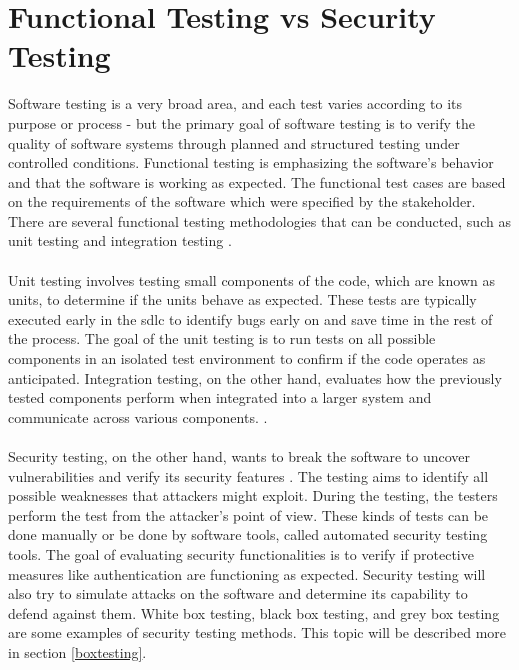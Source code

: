 \section{Functional Testing vs Security Testing}
\label{Functional Testing vs Security Testing}
Software testing is a very broad area, and each test varies according to its purpose or process - but the primary goal of software testing is to verify the quality of software systems through planned and structured testing under controlled conditions. Functional testing is emphasizing the software's behavior and that the software is working as expected. The functional test cases are based on the requirements of the software which were specified by the stakeholder. There are several functional testing methodologies that can be conducted, such as unit testing and integration testing \cite{difftesting}. 
\\~\\
Unit testing involves testing small components of the code, which are known as units, to determine if the units behave as expected. These tests are typically executed early in the \acrshort{sdlc} to identify bugs early on and save time in the rest of the process. The goal of the unit testing is to run tests on all possible components in an isolated test environment to confirm if the code operates as anticipated. Integration testing, on the other hand, evaluates how the previously tested components perform when integrated into a larger system and communicate across various components. \cite{unitvsintergration}.
\\~\\
Security testing, on the other hand, wants to break the software to uncover vulnerabilities and verify its security features \cite{whysectest}. The testing aims to identify all possible weaknesses that attackers might exploit. During the testing, the testers perform the test from the attacker's point of view. These kinds of tests can be done manually or be done by software tools, called automated security testing tools. The goal of evaluating security functionalities is to verify if protective measures like authentication are functioning as expected. Security testing will also try to simulate attacks on the software and determine its capability to defend against them. White box testing, black box testing, and grey box testing are some examples of security testing methods. This topic will be described more in section \ref{boxtesting}. 





